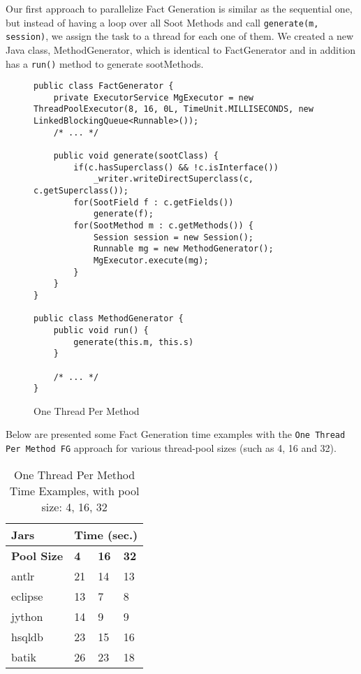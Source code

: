 \documentclass{dithesis}
\begin{document}
        Our first approach to parallelize Fact Generation is similar as the sequential one, but instead of having a loop over all Soot Methods and call \texttt{generate(m, session)}, we assign the task to a thread for each one of them. We created a new Java class, MethodGenerator, which is identical to FactGenerator and in addition has a \texttt{run()} method to generate sootMethods.
        \begin{figure}[H]
\begin{lstlisting}
public class FactGenerator {
    private ExecutorService MgExecutor = new ThreadPoolExecutor(8, 16, 0L, TimeUnit.MILLISECONDS, new LinkedBlockingQueue<Runnable>());
    /* ... */

    public void generate(sootClass) {
        if(c.hasSuperclass() && !c.isInterface())
            _writer.writeDirectSuperclass(c, c.getSuperclass());
        for(SootField f : c.getFields())
            generate(f);
        for(SootMethod m : c.getMethods()) {
            Session session = new Session();
            Runnable mg = new MethodGenerator();
            MgExecutor.execute(mg);
        }
    }
}

public class MethodGenerator {
    public void run() {
        generate(this.m, this.s)
    }

    /* ... */
}
\end{lstlisting}
        \caption{One Thread Per Method}
        \end{figure}

        Below are presented some Fact Generation time examples with the \texttt{One Thread Per Method FG} approach for various thread-pool sizes (such as 4, 16 and 32).
		\begin{table}[H]
			\centering
            \begin{tabular}{@{}l|lll@{}}
            \toprule
            \textbf{Jars}    	& \multicolumn{3}{l}{\textbf{Time (sec.)}}  \\ \midrule
            \textbf{Pool Size} 	& \textbf{4}  & \textbf{16}  & \textbf{32}  \\ \midrule
            antlr            	& 21          & 14           & 13           \\
            eclipse          	& 13          & 7            & 8            \\
            jython           	& 14          & 9            & 9            \\
            hsqldb           	& 23          & 15           & 16           \\
            batik            	& 26          & 23           & 18           \\ \bottomrule
            \end{tabular}
            \newline
			\caption{One Thread Per Method Time Examples, with pool size: 4, 16, 32}
		\end{table}
\end{document}

